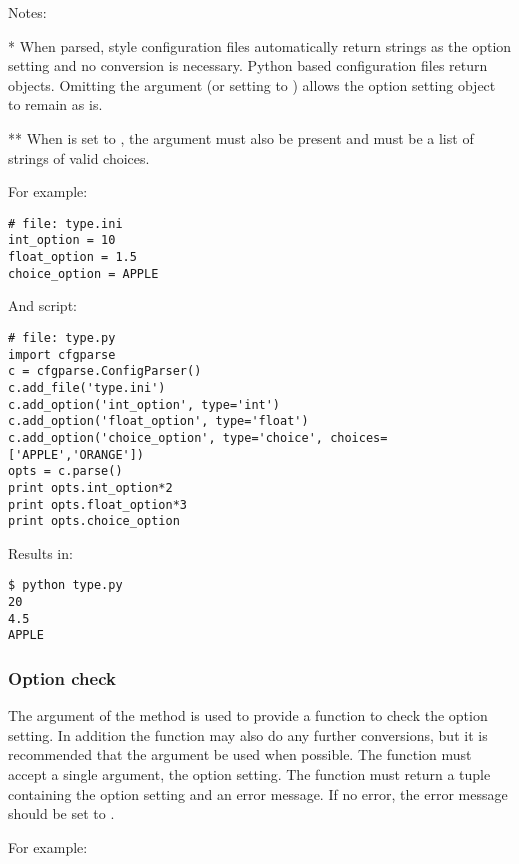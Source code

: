 \documentclass{howto}
\begin{document}
Notes:

*   When parsed,  style configuration files automatically return
    strings as the option setting and no conversion is necessary.  Python
    based configuration files return objects.  Omitting the 
    argument (or setting  to ) allows the option setting 
    object to remain as is.    

**  When  is set to , the  argument
    must also be present and must be a list of strings of valid choices.

For example:

\begin{verbatim}
# file: type.ini
int_option = 10
float_option = 1.5
choice_option = APPLE 
\end{verbatim}

And script:

\begin{verbatim}
# file: type.py
import cfgparse
c = cfgparse.ConfigParser()
c.add_file('type.ini')
c.add_option('int_option', type='int')
c.add_option('float_option', type='float')
c.add_option('choice_option', type='choice', choices=['APPLE','ORANGE'])
opts = c.parse()
print opts.int_option*2
print opts.float_option*3
print opts.choice_option
\end{verbatim}

Results in:
\begin{verbatim}
$ python type.py
20
4.5
APPLE
\end{verbatim}
 
\subsubsection{Option check\label{cfgparse-option-check}}
 
The  argument of the  method is used to provide
a function to check the option setting.  In addition the function may also
do any further conversions, but it is recommended that the 
argument be used when possible.  The  function must accept a single
argument, the option setting.  The function must return a tuple containing
the option setting and an error message.  If no error, the error message 
should be set to .

For example:
\end{document}
